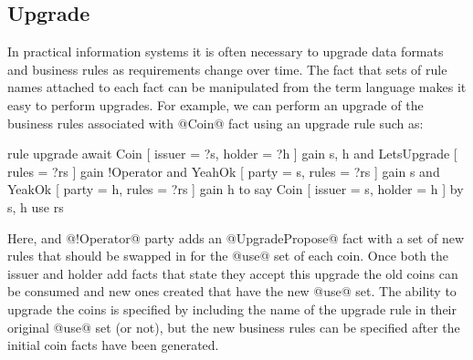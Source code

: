 



\subsection{Upgrade}
In practical information systems it is often necessary to upgrade data formats and business rules as requirements change over time. The fact that sets of rule names attached to each fact can be manipulated from the term language makes it easy to perform upgrades. For example, we can perform an upgrade of the business rules associated with @Coin@ fact using an upgrade rule such as:

\begin{small}
\begin{code}
  rule  upgrade
  await Coin [ issuer = ?s, holder = ?h ]  gain {s, h}
    and LetsUpgrade [ rules = ?rs ]     gain {!Operator}
    and YeahOk      [ party = s, rules = ?rs ] gain {s}
    and YeakOk      [ party = h, rules = ?rs ] gain {h}
   to
    say Coin [ issuer = s, holder = h ]
     by {s, h} use rs
\end{code}
\end{small}

Here, and @!Operator@ party adds an @UpgradePropose@ fact with a set of new rules that should be swapped in for the @use@ set of each coin. Once both the issuer and holder add facts that state they accept this upgrade the old coins can be consumed and new ones created that have the new @use@ set. The ability to upgrade the coins is specified by including the name of the upgrade rule in their original @use@ set (or not), but the new business rules can be specified after the initial coin facts have been generated.


